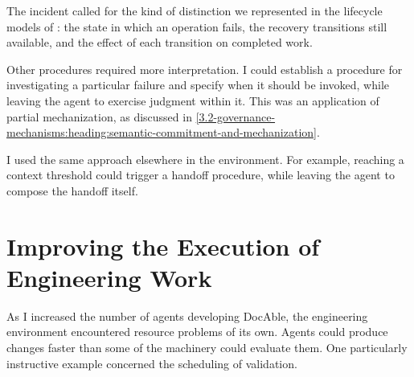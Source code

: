 The incident called for the kind of distinction we represented in the lifecycle models of : the state in which an operation fails, the recovery transitions still available, and the effect of each transition on completed work.



Other procedures required more interpretation. I could establish a procedure for investigating a particular failure and specify when it should be invoked, while leaving the agent to exercise judgment within it. This was an application of partial mechanization, as discussed in \autoref{3.2-governance-mechanisms:heading:semantic-commitment-and-mechanization}.

I used the same approach elsewhere in the environment. For example, reaching a context threshold could trigger a handoff procedure, while leaving the agent to compose the handoff itself.




\section{Improving the Execution of Engineering Work}\label{heading:when-validation-becomes-the-bottleneck}

As I increased the number of agents developing DocAble, the engineering environment encountered resource problems of its own. Agents could produce changes faster than some of the machinery could evaluate them. One particularly instructive example concerned the scheduling of validation.


